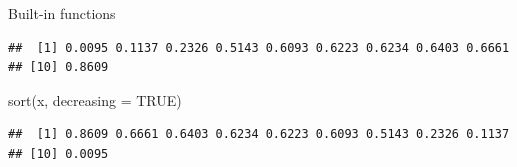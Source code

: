 \documentclass[
  9pt,
  ignorenonframetext,
]{beamer}
\newenvironment{Shaded}{\begin{snugshade}}{\end{snugshade}}
\newcommand{\DataTypeTok}[1]{\textcolor[rgb]{0.87,0.87,0.75}{#1}}
\newcommand{\KeywordTok}[1]{\textcolor[rgb]{0.94,0.87,0.69}{#1}}
\newcommand{\NormalTok}[1]{\textcolor[rgb]{0.80,0.80,0.80}{#1}}
\newcommand{\OtherTok}[1]{\textcolor[rgb]{0.94,0.94,0.56}{#1}}
\begin{document}
\begin{frame}[fragile]{Built-in functions}
\begin{verbatim}
##  [1] 0.0095 0.1137 0.2326 0.5143 0.6093 0.6223 0.6234 0.6403 0.6661
## [10] 0.8609
\end{verbatim}

\begin{Shaded}
\begin{Highlighting}[]
\KeywordTok{sort}\NormalTok{(x, }\DataTypeTok{decreasing =} \OtherTok{TRUE}\NormalTok{)}
\end{Highlighting}
\end{Shaded}

\begin{verbatim}
##  [1] 0.8609 0.6661 0.6403 0.6234 0.6223 0.6093 0.5143 0.2326 0.1137
## [10] 0.0095
\end{verbatim}
\end{frame}
\end{document}
